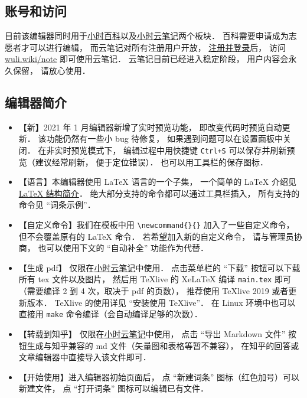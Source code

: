\subsection{账号和访问}
目前该编辑器同时用于\href{http://wuli.wiki/book/}{小时百科}以及\href{http://wuli.wiki/note/}{小时云笔记}两个板块． 百科需要申请成为志愿者才可以进行编辑， 而云笔记对所有注册用户开放， \href{https://wuli.wiki/authentication/login}{注册并登录}后， 访问 \href{http://wuli.wiki/note/}{wuli.wiki/note} 即可使用云笔记． 云笔记目前已经进入稳定阶段， 用户内容会永久保留， 请放心使用．

\subsection{编辑器简介}

\begin{itemize}
\item 【新】2021 年 1 月编辑器新增了实时预览功能， 即改变代码时预览自动更新． 该功能仍然有一些小 bug 待修复， 如果遇到问题可以在设置面板中关闭． 在非实时预览模式下， 编辑过程中用快捷键 \verb|Ctrl+S| 可以保存并刷新预览（建议经常刷新， 便于定位错误）． 也可以用工具栏的保存图标．
\item 【语言】本编辑器使用 LaTeX 语言的一个子集， 一个简单的 LaTeX 介绍见 \href{https://wuli.wiki/online/latxIn.html}{LaTeX 结构简介}． 绝大部分支持的命令都可以通过工具栏插入， 所有支持的命令见 “词条示例”．
\item 【自定义命令】我们在模板中用 \verb|\newcommand{}{}| 加入了一些自定义命令， 但不会覆盖原有的 LaTeX 命令． 若希望加入新的自定义命令， 请与管理员协商， 也可以使用下文的 “自动补全” 功能作为代替．
\item 【生成 pdf】 仅限在\href{http://wuli.wiki/note/}{小时云笔记}中使用． 点击菜单栏的 “下载” 按钮可以下载所有 tex 文件以及图片， 然后用 TeXlive 的 XeLaTeX 编译 \verb|main.tex| 即可（需要编译 2 到 4 次，取决于 pdf 的页数）， 推荐使用 TeXlive 2019 或者更新版本． TeXlive 的使用详见 “安装使用 TeXlive”． 在 Linux 环境中也可以直接用 \verb|make| 命令编译（会自动编译足够的次数）．
\item 【转载到知乎】 仅限在\href{http://wuli.wiki/note/}{小时云笔记}中使用， 点击 “导出 Markdown 文件” 按钮生成与知乎兼容的 md 文件（矢量图和表格等暂不兼容）， 在知乎的回答或文章编辑器中直接导入该文件即可．
\item 【开始使用】进入编辑器初始页面后， 点 “新建词条” 图标（红色加号）可以新建文件， 点 “打开词条” 图标可以编辑已有文件．

\end{itemize}

